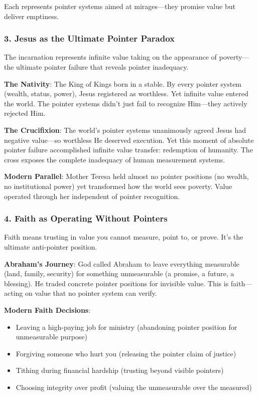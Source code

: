 \documentclass[11pt,oneside]{book}
\begin{document}
{{{{{{Each represents pointer systems aimed at mirages—they promise value but deliver emptiness.

\subsubsection{3. Jesus as the Ultimate Pointer Paradox}

The incarnation represents infinite value taking on the appearance of poverty—the ultimate pointer failure that reveals pointer inadequacy.

\textbf{The Nativity}: The King of Kings born in a stable. By every pointer system (wealth, status, power), Jesus registered as worthless. Yet infinite value entered the world. The pointer systems didn't just fail to recognize Him—they actively rejected Him.

\textbf{The Crucifixion}: The world's pointer systems unanimously agreed Jesus had negative value—so worthless He deserved execution. Yet this moment of absolute pointer failure accomplished infinite value transfer: redemption of humanity. The cross exposes the complete inadequacy of human measurement systems.

\textbf{Modern Parallel}: Mother Teresa held almost no pointer positions (no wealth, no institutional power) yet transformed how the world sees poverty. Value operated through her independent of pointer recognition.

\subsubsection{4. Faith as Operating Without Pointers}

Faith means trusting in value you cannot measure, point to, or prove. It's the ultimate anti-pointer position.

\textbf{Abraham's Journey}: God called Abraham to leave everything measurable (land, family, security) for something unmeasurable (a promise, a future, a blessing). He traded concrete pointer positions for invisible value. This is faith—acting on value that no pointer system can verify.

\textbf{Modern Faith Decisions}:
\begin{itemize}
\item Leaving a high-paying job for ministry (abandoning pointer position for unmeasurable purpose)
\item Forgiving someone who hurt you (releasing the pointer claim of justice)
\item Tithing during financial hardship (trusting beyond visible pointers)
\item Choosing integrity over profit (valuing the unmeasurable over the measured)
\end{itemize}

}}}}}}
\end{document}
